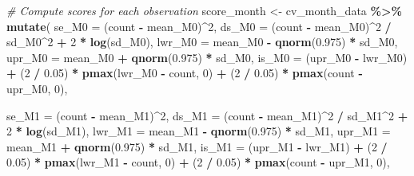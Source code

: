 \documentclass[
]{article}
\newenvironment{Shaded}{\begin{snugshade}}{\end{snugshade}}
\newcommand{\AttributeTok}[1]{\textcolor[rgb]{0.13,0.29,0.53}{#1}}
\newcommand{\CommentTok}[1]{\textcolor[rgb]{0.56,0.35,0.01}{\textit{#1}}}
\newcommand{\DecValTok}[1]{\textcolor[rgb]{0.00,0.00,0.81}{#1}}
\newcommand{\FloatTok}[1]{\textcolor[rgb]{0.00,0.00,0.81}{#1}}
\newcommand{\FunctionTok}[1]{\textcolor[rgb]{0.13,0.29,0.53}{\textbf{#1}}}
\newcommand{\NormalTok}[1]{#1}
\newcommand{\OtherTok}[1]{\textcolor[rgb]{0.56,0.35,0.01}{#1}}
\newcommand{\SpecialCharTok}[1]{\textcolor[rgb]{0.81,0.36,0.00}{\textbf{#1}}}
\begin{document}
\begin{Shaded}
\begin{Highlighting}[]
\CommentTok{\# Compute scores for each observation}
\NormalTok{score\_month }\OtherTok{\textless{}{-}}\NormalTok{ cv\_month\_data }\SpecialCharTok{\%\textgreater{}\%}
  \FunctionTok{mutate}\NormalTok{(}
    \AttributeTok{se\_M0 =}\NormalTok{ (count }\SpecialCharTok{{-}}\NormalTok{ mean\_M0)}\SpecialCharTok{\^{}}\DecValTok{2}\NormalTok{,}
    \AttributeTok{ds\_M0 =}\NormalTok{ (count }\SpecialCharTok{{-}}\NormalTok{ mean\_M0)}\SpecialCharTok{\^{}}\DecValTok{2} \SpecialCharTok{/}\NormalTok{ sd\_M0}\SpecialCharTok{\^{}}\DecValTok{2} \SpecialCharTok{+} \DecValTok{2} \SpecialCharTok{*} \FunctionTok{log}\NormalTok{(sd\_M0),}
    \AttributeTok{lwr\_M0 =}\NormalTok{ mean\_M0 }\SpecialCharTok{{-}} \FunctionTok{qnorm}\NormalTok{(}\FloatTok{0.975}\NormalTok{) }\SpecialCharTok{*}\NormalTok{ sd\_M0,}
    \AttributeTok{upr\_M0 =}\NormalTok{ mean\_M0 }\SpecialCharTok{+} \FunctionTok{qnorm}\NormalTok{(}\FloatTok{0.975}\NormalTok{) }\SpecialCharTok{*}\NormalTok{ sd\_M0,}
    \AttributeTok{is\_M0 =}\NormalTok{ (upr\_M0 }\SpecialCharTok{{-}}\NormalTok{ lwr\_M0) }\SpecialCharTok{+}
\NormalTok{      (}\DecValTok{2} \SpecialCharTok{/} \FloatTok{0.05}\NormalTok{) }\SpecialCharTok{*} \FunctionTok{pmax}\NormalTok{(lwr\_M0 }\SpecialCharTok{{-}}\NormalTok{ count, }\DecValTok{0}\NormalTok{) }\SpecialCharTok{+}
\NormalTok{      (}\DecValTok{2} \SpecialCharTok{/} \FloatTok{0.05}\NormalTok{) }\SpecialCharTok{*} \FunctionTok{pmax}\NormalTok{(count }\SpecialCharTok{{-}}\NormalTok{ upr\_M0, }\DecValTok{0}\NormalTok{),}
    
    \AttributeTok{se\_M1 =}\NormalTok{ (count }\SpecialCharTok{{-}}\NormalTok{ mean\_M1)}\SpecialCharTok{\^{}}\DecValTok{2}\NormalTok{,}
    \AttributeTok{ds\_M1 =}\NormalTok{ (count }\SpecialCharTok{{-}}\NormalTok{ mean\_M1)}\SpecialCharTok{\^{}}\DecValTok{2} \SpecialCharTok{/}\NormalTok{ sd\_M1}\SpecialCharTok{\^{}}\DecValTok{2} \SpecialCharTok{+} \DecValTok{2} \SpecialCharTok{*} \FunctionTok{log}\NormalTok{(sd\_M1),}
    \AttributeTok{lwr\_M1 =}\NormalTok{ mean\_M1 }\SpecialCharTok{{-}} \FunctionTok{qnorm}\NormalTok{(}\FloatTok{0.975}\NormalTok{) }\SpecialCharTok{*}\NormalTok{ sd\_M1,}
    \AttributeTok{upr\_M1 =}\NormalTok{ mean\_M1 }\SpecialCharTok{+} \FunctionTok{qnorm}\NormalTok{(}\FloatTok{0.975}\NormalTok{) }\SpecialCharTok{*}\NormalTok{ sd\_M1,}
    \AttributeTok{is\_M1 =}\NormalTok{ (upr\_M1 }\SpecialCharTok{{-}}\NormalTok{ lwr\_M1) }\SpecialCharTok{+}
\NormalTok{      (}\DecValTok{2} \SpecialCharTok{/} \FloatTok{0.05}\NormalTok{) }\SpecialCharTok{*} \FunctionTok{pmax}\NormalTok{(lwr\_M1 }\SpecialCharTok{{-}}\NormalTok{ count, }\DecValTok{0}\NormalTok{) }\SpecialCharTok{+}
\NormalTok{      (}\DecValTok{2} \SpecialCharTok{/} \FloatTok{0.05}\NormalTok{) }\SpecialCharTok{*} \FunctionTok{pmax}\NormalTok{(count }\SpecialCharTok{{-}}\NormalTok{ upr\_M1, }\DecValTok{0}\NormalTok{),}
    

\end{Highlighting}
\end{Shaded}
\end{document}
